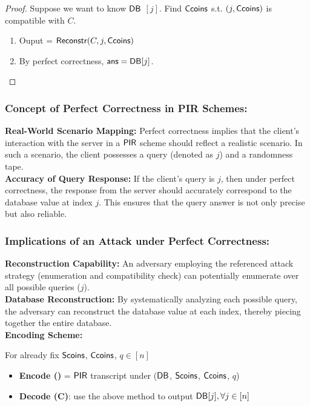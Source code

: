 {\begin{proof}
Suppose we want to know ${\sf DB}$ $[j]$. Find ${\sf Ccoins}$ s.t. $({j},{\sf Ccoins})$ is compatible with $C$. 

\begin{enumerate}
    \item Ouput = ${\sf Reconstr} (C,{j},{\sf Ccoins})$
    \item By perfect correctness, ${\sf ans} = {\sf DB}[j]$.
\end{enumerate}

\end{proof}

\subsubsection{Concept of Perfect Correctness in PIR Schemes:}

\textbf{Real-World Scenario Mapping:}
Perfect correctness implies that the client's interaction with the server in a ${\sf PIR}$ scheme should reflect a realistic scenario. In such a scenario, the client possesses a query (denoted as $j$) and a randomness tape. \\

\textbf{Accuracy of Query Response:}
 If the client's query is $j$, then under perfect correctness, the response from the server should accurately correspond to the database value at index $j$. This ensures that the query answer is not only precise but also reliable.\\

\subsubsection{Implications of an Attack under Perfect Correctness:}

\textbf{Reconstruction Capability:}
 An adversary employing the referenced attack strategy (enumeration and compatibility check) can potentially enumerate over all possible queries ($j$).\\

\textbf{Database Reconstruction:} 
By systematically analyzing each possible query, the adversary can reconstruct the database value at each index, thereby piecing together the entire database.\\

\textbf{Encoding Scheme:}

For already fix ${\sf Scoins}$, ${\sf Ccoins}$, $q\in [n]$

\begin{itemize}
    \item \textbf{Encode (\DB)} = ${\sf PIR}$ transcript under (${\sf DB}$, ${\sf Scoins}$, ${\sf Ccoins}$, $q$)
    \item \textbf{Decode (C)}: use the above method to output ${\sf DB} [{j}],  \forall j \in [n]$ 
\end{itemize}
    
}
